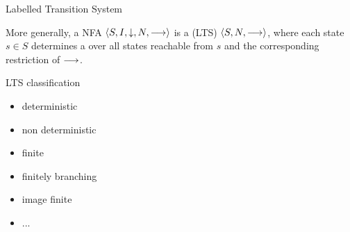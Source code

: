 \documentclass[aspectratio=169]{beamer}
\begin{document}


\begin{slide}{Labelled Transition System}
\small

More generally, a NFA $\mathopen{\langle}S,I,{\downarrow},N,\longrightarrow\mathclose{\rangle}$ is a  (LTS) $\mathopen{\langle}S,N,\longrightarrow\mathclose{\rangle}$, where each state $s \in S$ determines a  over all states reachable from $s$ and the corresponding restriction of $\longrightarrow$.

\begin{block}{LTS classification}
\begin{itemize}
\item \alert{deterministic}
\item \alert{non deterministic}
\item \alert{finite}
\item \alert{finitely branching}
\item \alert{image finite}
\item ...
\end{itemize}
\end{block}

\end{slide}


\end{document}
